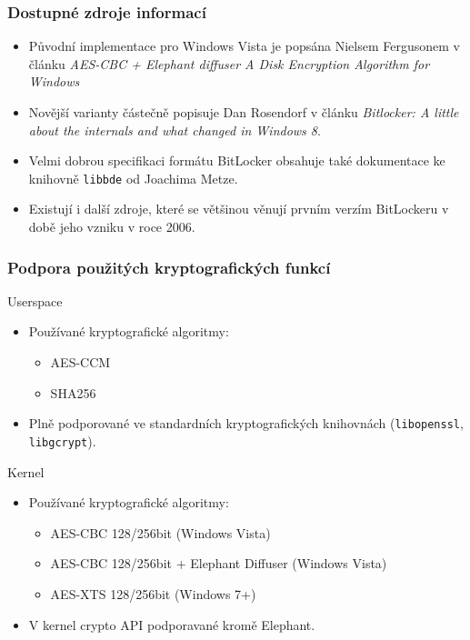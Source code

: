 \documentclass{beamer}
\begin{document}
\begin{frame}
	\frametitle{Dostupné zdroje informací}
	\begin{block}{}
		\begin{itemize}
			\item Původní implementace pro Windows Vista je popsána Nielsem Fergusonem v článku \emph{AES-CBC + Elephant diffuser A Disk Encryption Algorithm for Windows}
			\item Novější varianty částečně popisuje Dan Rosendorf v článku \emph{Bitlocker: A little about the internals and what changed in Windows 8}.
			\item Velmi dobrou specifikaci formátu BitLocker obsahuje také dokumentace ke knihovně \texttt{libbde} od Joachima Metze.
			\item Existují i další zdroje, které se většinou věnují prvním verzím BitLockeru v době jeho vzniku v roce 2006.
		\end{itemize}
	\end{block}

\end{frame}

\begin{frame}
	\frametitle{Podpora použitých kryptografických funkcí}

	\begin{block}{Userspace}
		\begin{itemize}
			\item Používané kryptografické algoritmy:
			\begin{itemize}
				\item AES-CCM
				\item SHA256
			\end{itemize}
			\item Plně podporované ve standardních kryptografických knihovnách (\texttt{libopenssl}, \texttt{libgcrypt}).
		\end{itemize}
	\end{block}

\vspace{0.5cm}

	\begin{block}{Kernel}
		\begin{itemize}
			\item Používané kryptografické algoritmy:
			\begin{itemize}
				\item AES-CBC 128/256bit (Windows Vista)
				\item AES-CBC 128/256bit + Elephant Diffuser (Windows Vista)
				\item AES-XTS 128/256bit (Windows 7+)
			\end{itemize}
			\item V kernel crypto API podporavané kromě Elephant.
		\end{itemize}
	\end{block}

\end{frame}
\end{document}
